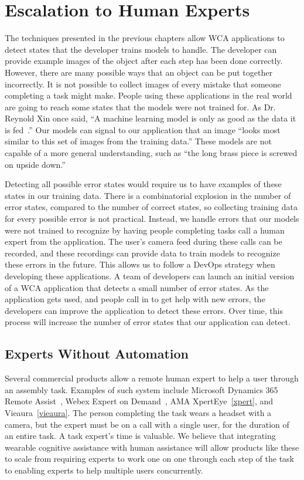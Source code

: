 \chapter{Escalation to Human Experts}\label{chap:escalation}

The techniques presented in the previous chapters allow WCA applications to
detect states that the developer trains models to handle.
The developer can provide example images of the object after each step has been
done correctly.
However, there are many possible ways that an object can be put together
incorrectly.
It is not possible to collect images of every mistake that someone completing a
task might make.
People using these
applications in the real world are going to reach some states that the models
were not trained for. As Dr. Reynold Xin once said,
``A machine learning model is only as good as the data it is fed~\cite{xin}.''
Our models can signal to our application that an image ``looks most similar to
this set of images from the training data.''
These models are not capable of a more general understanding, such as ``the long
brass piece is screwed on upside down.''

Detecting all possible error states would require us to have examples of these
states in our training data. There is a combinatorial explosion in the number of
error states, compared to the number of correct states, so collecting training
data for every possible error is not practical.
Instead, we handle errors that our models were not trained to recognize by
having people completing tasks call a human expert from the application.
The user's camera feed during these calls can be recorded, and these recordings
can provide data to train models to recognize these errors in the future.
This allows us to follow a DevOps strategy when developing these applications.
A team of developers can launch an initial version of a WCA application that
detects a small number of error states.
As the application gets used, and people call in to get help with new errors,
the developers can improve the application to detect these errors.
Over time, this process will increase the number of error states that our
application can detect.

\section{Experts Without Automation}

Several commercial products allow a remote human expert to help a user through
an assembly task.
Examples of such system include Microsoft Dynamics 365 Remote
Assist~\cite{dynamics365}, Webex Expert on Demand~\cite{webex},
AMA XpertEye~\ref{xpert}, and Vieaura~\ref{vieaura}.
The person completing the task wears a headset with a camera, but the expert
must be on a call with a single user, for the duration of an entire task.
A task expert's time is valuable.
We believe that integrating wearable cognitive assistance with
human assistance will allow products like these to scale from requiring
experts to work one on one through each step of the task to enabling experts to
help multiple users concurrently.

